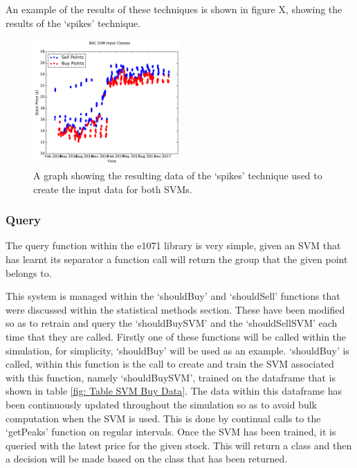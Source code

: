\documentclass[conference]{IEEEtran}
\begin{document}
An example of the results of these techniques is shown in figure X, showing the results of the `spikes' technique. 

\begin{figure}
\includegraphics[width=0.5\textwidth, angle=0]{Poster/SVMBuyPoints.pdf}
\caption{A graph showing the resulting data of the `spikes' technique used to create the input data for both SVMs.}
\label{fig:SVMBuyPoints}
\end{figure}

\subsubsection{Query}

The query function within the e1071 library is very simple, given an SVM that has learnt its separator a function call will return the group that the given point belongs to.

This system is managed within the `shouldBuy' and `shouldSell' functions that were discussed within the statistical methods section. These have been modified so as to retrain and query the `shouldBuySVM' and the `shouldSellSVM' each time that they are called. Firstly one of these functions will be called within the simulation, for simplicity, `shouldBuy' will be used as an example. `shouldBuy' is called, within this function is the call to create and train the SVM associated with this function, namely `shouldBuySVM', trained on the dataframe that is shown in table \ref{fig: Table SVM Buy Data}. The data within this dataframe has been continuously updated throughout the simulation so as to avoid bulk computation when the SVM is used. This is done by continual calls to the `getPeaks' function on regular intervals. Once the SVM has been trained, it is queried with the latest price for the given stock. This will return a class and then a decision will be made based on the class that has been returned.

\end{document}
